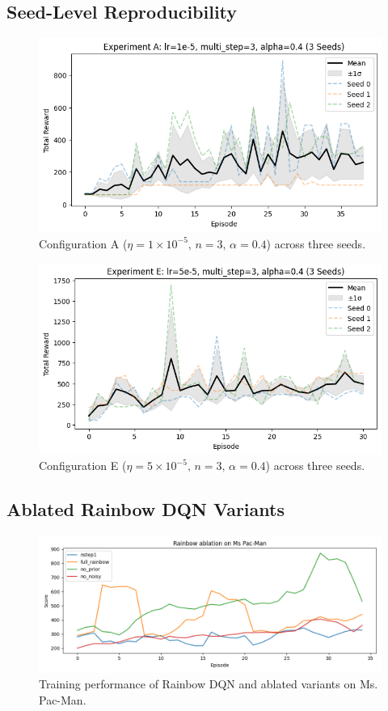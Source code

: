 \documentclass{article}
\begin{document}
\subsection{Seed-Level Reproducibility}
\begin{figure}[htbp]
  \centering
  \includegraphics[width=0.8\linewidth]{rainbow_A_seed.png}
  \caption{Configuration A (\(\eta=1\times10^{-5},\,n=3,\,\alpha=0.4\)) across three seeds.}
  \label{fig:seed_A}
\end{figure}

\begin{figure}[htbp]
  \centering
  \includegraphics[width=0.8\linewidth]{rainbow_E_Seed.png}
  \caption{Configuration E (\(\eta=5\times10^{-5},\,n=3,\,\alpha=0.4\)) across three seeds.}
  \label{fig:seed_E}
\end{figure}

\subsection{Ablated Rainbow DQN Variants}
\begin{figure}[htbp]
  \centering
  \includegraphics[width=\linewidth]{rainbow_ablation_smooth.png}
  \caption{Training performance of Rainbow DQN and ablated variants on Ms. Pac-Man.}
  \label{fig:rainbow_ablation}
\end{figure}

\clearpage
{}


\end{document}
